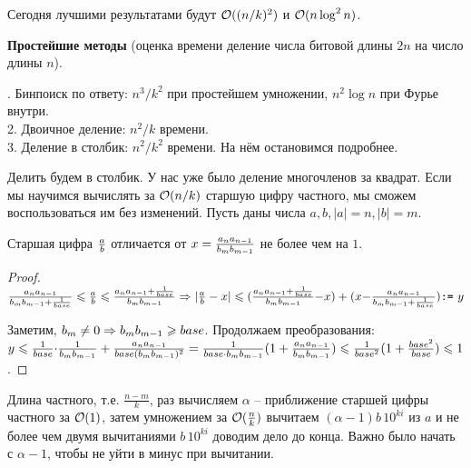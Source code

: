Сегодня лучшими результатами будут $\mathcal{O}((n/k)^2)$ и $\mathcal{O}(n \log^2 n)$.

\down
{\bf Простейшие методы} (оценка времени деление числа битовой длины $2n$ на число длины $n$).

. Бинпоиск по ответу: $n^3/k^2$ при простейшем умножении, $n^2 \log n$ при Фурье внутри.\\
2. Двоичное деление: $n^2/k$ времени.\\
3. Деление в столбик: $n^2/k^2$ времени. На нём остановимся подробнее.

\pagebreak
\vspace*{-1.5em}

Делить будем в столбик. У нас уже было деление многочленов за квадрат.
Если мы научимся вычислять за $\mathcal{O}(n/k)$ старшую цифру частного, мы сможем воспользоваться им без изменений.
Пусть даны числа $a, b, |a| = n, |b| = m$.

\begin{Lm}
Старшая цифра ${\textstyle\frac{a}{b}}$ отличается от $x = {\textstyle\frac{a_na_{n-1}}{b_mb_{m-1}}}$ не более чем на $1$.
\end{Lm}

\vspace*{-1.5em}
\begin{proof}
$
{\textstyle\frac{a_na_{n-1}}{b_mb_{m-1}+{\scriptstyle\frac{1}{base}}}} \leqslant {\textstyle\frac{a}{b}} \leqslant {\textstyle\frac{a_na_{n-1}+{\scriptstyle\frac{1}{base}}}{b_mb_{m-1}}}
\Rightarrow
|{\textstyle\frac{a}{b}} - x| \leqslant ({\textstyle\frac{a_na_{n-1}+{\scriptstyle\frac{1}{base}}}{b_mb_{m-1}}} {-} x) + (x {-} {\textstyle\frac{a_na_{n-1}}{b_mb_{m-1}+{\scriptstyle\frac{1}{base}}}})
\texttt{:=}\ y
$

\down
Заметим, $b_m \neq 0 \Rightarrow b_mb_{m-1} \geqslant base$. Продолжаем преобразования:\\
$y \leqslant {\textstyle\frac{1}{base}}{\cdot}{\textstyle\frac{1}{b_mb_{m-1}}} + {\textstyle\frac{a_na_{n-1}}{base(b_mb_{m-1})^2}} = 
{\textstyle\frac{1}{base{\cdot}b_mb_{m-1}}}(1 + {\textstyle\frac{a_na_{n-1}}{b_mb_{m-1}}}) \leqslant {\textstyle\frac{1}{base^2}}(1 + {\textstyle\frac{base^2}{base}}) \leqslant 1$.
\end{proof}

\up
{}

Длина частного, т.е. $\frac{n{-}m}{k}$, раз вычисляем $\alpha$ -- приближение старшей цифры частного за $\mathcal{O}(1)$,
затем умножением за $\mathcal{O}(\frac{n}{k})$ вычитаем $(\alpha{-}1) b\,10^{ki}$ из $a$ и не более чем двумя вычитаниями
$b\,10^{ki}$ доводим дело до конца. Важно было начать с $\alpha{-}1$, чтобы не уйти в минус при вычитании.